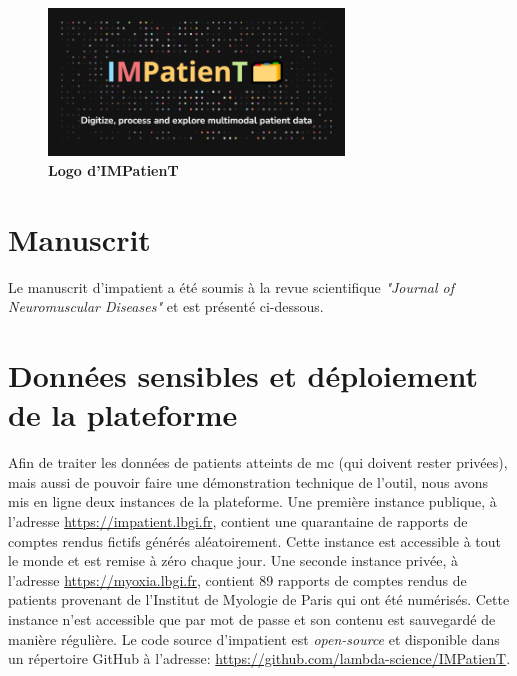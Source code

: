 \begin{figure}[H]
  \centering
  \includegraphics[width=0.7\textwidth]{figures/impatient_banner.png}
  \caption[Logo IMPatienT]{\textbf{Logo d’IMPatienT}}
  \label{fig:impatient_logo}
\end{figure}


\section{Manuscrit} 
Le manuscrit d'\gls{impatient} a été soumis à la revue scientifique  \textit{"Journal of Neuromuscular Diseases"} et  est présenté ci-dessous.




\section{Données sensibles et déploiement de la plateforme}
Afin de traiter les données de patients atteints de \gls{mc} (qui doivent rester privées), mais aussi de pouvoir faire une démonstration technique de l'outil, nous avons mis en ligne deux instances de la plateforme. Une première instance publique, à l'adresse \url{https://impatient.lbgi.fr}, contient une quarantaine de rapports de comptes rendus fictifs générés aléatoirement. Cette instance est accessible à tout le monde et est remise à zéro chaque jour. Une seconde instance privée, à l'adresse \url{https://myoxia.lbgi.fr}, contient 89 rapports de comptes rendus de patients provenant de l'Institut de Myologie de Paris qui ont été numérisés. Cette instance n'est accessible que par mot de passe et son contenu est sauvegardé de manière régulière. Le code source d'\gls{impatient} est \textit{open-source} et disponible dans un répertoire GitHub à l'adresse: \url{https://github.com/lambda-science/IMPatienT}.


